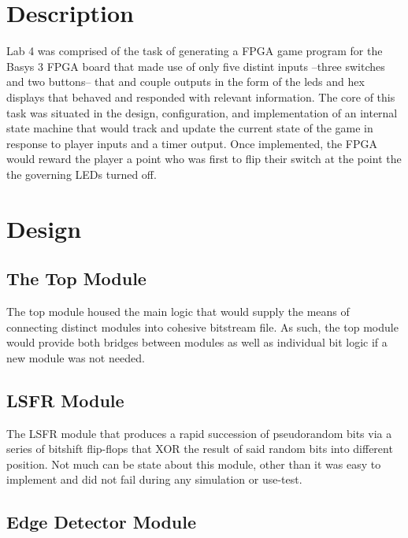 \documentclass[stu,12pt,floatsintext]{apa7}
\begin{document}
\maketitle

\section{Description}

Lab 4 was comprised of the task of generating a FPGA game program for the Basys 3 FPGA board that made use of only five distint inputs --three switches and two buttons-- that and couple outputs in the form of the leds and hex displays that behaved and responded with relevant information. The core of this task was situated in the design, configuration, and implementation of an internal state machine that would track and update the current state of the game in response to player inputs and a timer output. Once implemented, the FPGA would reward the player a point who was first to flip their switch at the point the the governing LEDs turned off. 

\newpage
{}

\section{Design}
\subsection{The Top Module}

The top module housed the main logic that would supply the means of connecting distinct modules into cohesive bitstream file. As such, the top module would provide both bridges between modules as well as individual bit logic if a new module was not needed.

\subsection{LSFR Module}

The LSFR module that produces a rapid succession of pseudorandom bits via a series of bitshift flip-flops that XOR the result of said random bits into different position. Not much can be state about this module, other than it was easy to implement and did not fail during any simulation or use-test.

\subsection{Edge Detector Module}
\end{document}
